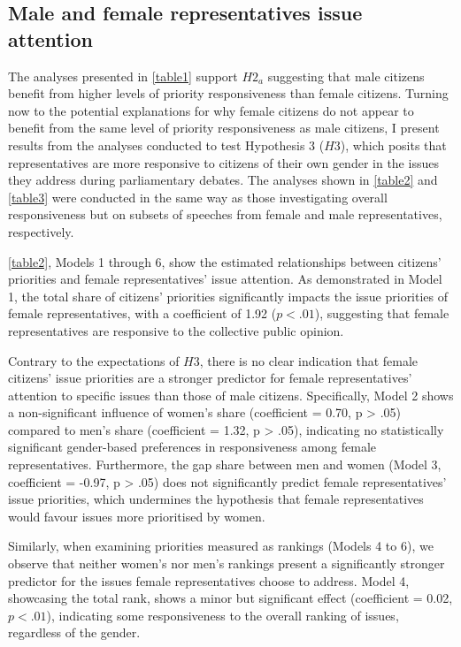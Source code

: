 \subsection*{Male and female representatives issue attention}
The analyses presented in \cref{table1} support $H2_{a}$ suggesting that male citizens benefit from higher levels of priority responsiveness than female citizens.
Turning now to the potential explanations for why female citizens do not appear to benefit from the same level of priority responsiveness as male citizens, I present results from the analyses conducted to test Hypothesis 3 ($H3$), which posits that representatives are more responsive to citizens of their own gender in the issues they address during parliamentary debates. The analyses shown in \cref{table2} and \cref{table3} were conducted in the same way as those investigating overall responsiveness but on subsets of speeches from female and male representatives, respectively.


\cref{table2}, Models 1 through 6, show the estimated relationships between citizens' priorities and female representatives' issue attention. As demonstrated in Model 1, the total share of citizens' priorities significantly impacts the issue priorities of female representatives, with a coefficient of 1.92 ($p < .01$), suggesting that female representatives are responsive to the collective public opinion.

Contrary to the expectations of $ H3 $, there is no clear indication that female citizens' issue priorities are a stronger predictor for female representatives' attention to specific issues than those of male citizens. Specifically, Model 2 shows a non-significant influence of women's share (coefficient = 0.70, p > .05) compared to men's share (coefficient = 1.32, p > .05), indicating no statistically significant gender-based preferences in responsiveness among female representatives. Furthermore, the gap share between men and women (Model 3, coefficient = -0.97, p > .05) does not significantly predict female representatives' issue priorities, which undermines the hypothesis that female representatives would favour issues more prioritised by women.

Similarly, when examining priorities measured as rankings (Models 4 to 6), we observe that neither women's nor men's rankings present a significantly stronger predictor for the issues female representatives choose to address. Model 4, showcasing the total rank, shows a minor but significant effect (coefficient = 0.02, $p < .01$), indicating some responsiveness to the overall ranking of issues, regardless of the gender.

